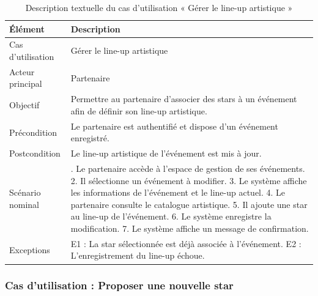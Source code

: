 \begin{table}[H]
\centering
\caption{Description textuelle du cas d’utilisation « Gérer le line-up artistique »}
\label{tableau:5-4}
\renewcommand{\arraystretch}{1.2}
\begin{tabularx}{\textwidth}{|>{\raggedright\arraybackslash}X|>{\raggedright\arraybackslash}X|}
\hline
\rowcolor[HTML]{ECF4FF}
\textbf{Élément} & \textbf{Description} \\
\hline
Cas d’utilisation & Gérer le line-up artistique \\
\hline
Acteur principal & Partenaire \\
\hline
Objectif & Permettre au partenaire d’associer des stars à un événement afin de définir son line-up artistique. \\
\hline
Précondition & Le partenaire est authentifié et dispose d’un événement enregistré. \\
\hline
Postcondition & Le line-up artistique de l’événement est mis à jour. \\
\hline
Scénario nominal & 1. Le partenaire accède à l’espace de gestion de ses événements.\newline{} 2. Il sélectionne un événement à modifier.\newline{} 3. Le système affiche les informations de l’événement et le line-up actuel.\newline{} 4. Le partenaire consulte le catalogue artistique.\newline{} 5. Il ajoute une star au line-up de l’événement.\newline{} 6. Le système enregistre la modification.\newline{} 7. Le système affiche un message de confirmation. \\
\hline
Exceptions & E1 : La star sélectionnée est déjà associée à l’événement.\newline{} E2 : L’enregistrement du line-up échoue. \\
\hline
\end{tabularx}
\end{table}


\subsubsection{Cas d’utilisation : Proposer une nouvelle star}


